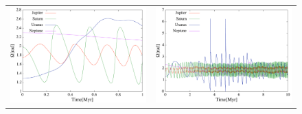 \documentclass[11pt,a4paper,oneside,onecolumn]{jarticle}
\begin{document}
\begin{figure}[H]
\begin{tabular}{cc}
\begin{minipage}[t]{0.45\hsize}
\centering
\includegraphics[width=7.6cm]{./image/move5Myr_capitalOMEGA_1Myr.pdf}
\end{minipage} &
\begin{minipage}[t]{0.45\hsize}
\centering
\includegraphics[width=7.6cm]{./image/move5Myr_capitalOMEGA_10Myr.pdf}
\end{minipage}
%
\end{tabular}
\caption{\label{}}
\end{figure}
\end{document}

